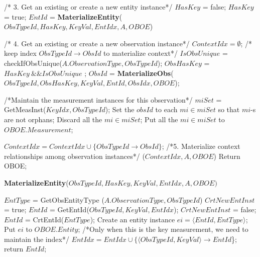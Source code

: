 \documentclass[10pt]{article}
\begin{document}
\begin{algorithm} [htb]
{\begin{algorithmic}
        \STATE
        \STATE /* 3. Get an existing or create a new entity instance*/
        \STATE $HasKey$ = false;
            \STATE $HasKey$ = true;
        \ENDIF
    	\STATE $EntId$ = {\bf MaterializeEntity}($ObsTypeId, HasKey, KeyVal, EntIdx, A, OBOE$)
    	
        \STATE
        \STATE/* 4. Get an existing or create a new observation instance*/
         \STATE $ContextIdx = \emptyset$;  /* keep index $ObsTypeId \rightarrow ObsId$ to materialize context*/
        \STATE $IsObsUnique$ = checkIfObsUnique($A.ObservationType, ObsTypeId$);
        \STATE $ObsHasKey$ = $HasKey~\&\& IsObsUnique$ ;
        \STATE $ObsId$ = {\bf MaterializeObs}($ObsTypeId, ObsHasKey,KeyVal,EntId,ObsIdx, OBOE$);

        \STATE
        \STATE /*Maintain the measurement instances for this observation*/
        \STATE $miSet$ = GetMeasInst($KeyIdx, ObsTypeId$);
            \STATE Set the $obsId$ to each $mi \in miSet$ so that $mi$-s are not orphans;
        \ELSE
            \STATE Discard all the $mi \in miSet$;
        \ENDIF
        \STATE Put all the $mi \in miSet$ to $OBOE.Measurement$;
        \STATE

    	\STATE $ContextIdx = ContextIdx \cup \{ObsTypeId \rightarrow ObsId\}$;
        \ENDFOR
    \ENDFOR
    \STATE
	\STATE /*5. Materialize context relationships among observation instances*/
	($ContextIdx, A, OBOE$)
\ENDFOR
\STATE Return OBOE;
\end{algorithmic}
}
\end{algorithm}

\begin{algorithm} [htb]
\caption{{\bf MaterializeEntity}($ObsTypeId, HasKey, KeyVal, EntIdx, A, OBOE)$}
\begin{algorithmic}
\STATE $EntType$ = GetObsEntityType ($A.ObservationType, ObsTypeId$)
\STATE $CrtNewEntInst$ = true;
	\STATE $EntId$ = GetEntId($ObsTypeId, KeyVal, EntIdx$); %
		\STATE $CrtNewEntInst$ = false;
	\ENDIF
\ENDIF
{}
	\STATE $EntId$ = CrtEntId($EntType$);
	\STATE Create an entity instance $ei = \langle EntId, EntType\rangle $;
	\STATE Put $ei$ to $OBOE.Entity$;
        \STATE /*Only when this is the key measurement, we need to maintain the index*/
        \STATE $EntIdx = EntIdx \cup \{\langle ObsTypeId, KeyVal \rangle \rightarrow EntId$\};
    \ENDIF
\ENDIF
\STATE return $EntId$;
\end{algorithmic}
\end{algorithm}
\end{document}

